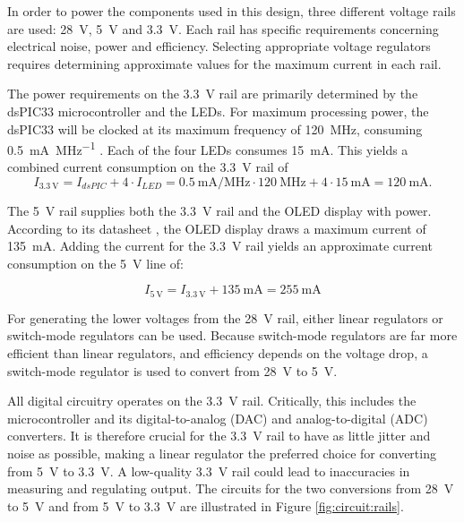 \label{sec:voltage_rails}

In order to power the components  used in this design, three different voltage
rails are used: \SI{28}{\volt}, \SI{5}{\volt}  and \SI{3.3}{\volt}.  Each rail
has specific  requirements concerning electrical noise,  power and efficiency.
Selecting  appropriate  voltage  regulators requires  determining  approximate
values for the maximum current in each rail.

The power requirements on the \SI{3.3}{\volt} rail are primarily determined by
the dsPIC33  microcontroller and the  LEDs. For maximum processing  power, the
dsPIC33 will  be clocked  at its  maximum frequency  of \SI{120}{\mega\hertz},
consuming  \SI{0.5}{\milli\ampere\per\mega\hertz}  \cite{ref:datasheet:dspic}.
Each of the four LEDs consumes \SI{15}{\milli\ampere}.  This yields a combined
current consumption on the \SI{3.3}{\volt} rail of
\begin{equation}
    I_{\SI{3.3}{\volt}} = I_{dsPIC} + 4 \cdot I_{LED} = \SI{0.5}{\milli\ampere\per\mega\hertz} \cdot \SI{120}{\mega\hertz} + 4 \cdot \SI{15}{\milli\ampere} = \SI{120}{\milli\ampere}\text{.}
\end{equation}

The \SI{5}{\volt}  rail supplies  both the \SI{3.3}{\volt}  rail and  the OLED
display with power. According to  its datasheet \cite{ref:datasheet:oled}, the
OLED display  draws a  maximum current of  \SI{135}{\milli\ampere}. Adding the
current for the \SI{3.3}{\volt} rail yields an approximate current consumption
on the \SI{5}{\volt} line of:

\begin{equation}
    I_{\SI{5}{\volt}} = I_{\SI{3.3}{\volt}} + \SI{135}{\milli\ampere} = \SI{255}{\milli\ampere}
\end{equation}


For  generating  the  lower  voltages from  the  \SI{28}{\volt}  rail,  either
linear regulators  or switch-mode regulators can  be used. Because switch-mode
regulators  are far  more  efficient than  linear  regulators, and  efficiency
depends on the  voltage drop, a switch-mode regulator is  used to convert from
\SI{28}{\volt} to \SI{5}{\volt}.

All  digital  circuitry  operates  on  the  \SI{3.3}{\volt}  rail. Critically,
this  includes  the  microcontroller   and  its  digital-to-analog  (DAC)  and
analog-to-digital   (ADC)  converters. It   is  therefore   crucial  for   the
\SI{3.3}{\volt} rail to have as little  jitter and noise as possible, making a
linear regulator  the preferred  choice for  converting from  \SI{5}{\volt} to
\SI{3.3}{\volt}. A low-quality \SI{3.3}{\volt} rail could lead to inaccuracies
in measuring and regulating output.  The circuits for the two conversions from
\SI{28}{\volt} to \SI{5}{\volt} and  from \SI{5}{\volt} to \SI{3.3}{\volt} are
illustrated in Figure \ref{fig:circuit:rails}.

